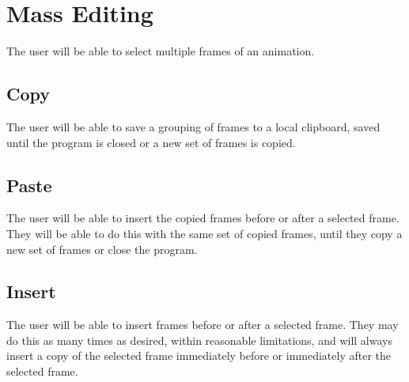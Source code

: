 \documentclass[12pt]{article}
\begin{document}
    \section{Mass Editing}
    The user will be able to select multiple frames of an animation.
        \subsection{Copy}
        The user will be able to save a grouping of frames to a local clipboard, saved until the program is closed or a new set of frames is copied.
        \subsection{Paste}
        The user will be able to insert the copied frames before or after a selected frame. They will be able to do this with the same set of copied frames, until they copy a new set of frames or close the program.
        \subsection{Insert}
        The user will be able to insert frames before or after a selected frame. They may do this as many times as desired, within reasonable limitations, and will always insert a copy of the selected frame immediately before or immediately after the selected frame.
\end{document}
